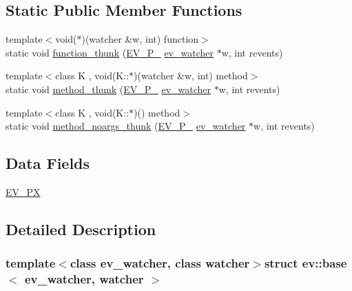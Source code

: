 \subsection*{\-Static \-Public \-Member \-Functions}
\begin{DoxyCompactItemize}
\item 
{\footnotesize template$<$void($\ast$)(watcher \&w, int) function$>$ }\\static void \hyperlink{structev_1_1base_ab6a9dbee5f754f64a234ad4e4d287d03}{function\-\_\-thunk} (\hyperlink{ev_8h_a8ac42969e0a499b8c1367f0ad85dbba9}{\-E\-V\-\_\-\-P\-\_\-} \hyperlink{structev__watcher}{ev\-\_\-watcher} $\ast$w, int revents)
\item 
{\footnotesize template$<$class K , void(\-K\-::$\ast$)(watcher \&w, int) method$>$ }\\static void \hyperlink{structev_1_1base_a8038092c2cdb65f0c09001e2eb846340}{method\-\_\-thunk} (\hyperlink{ev_8h_a8ac42969e0a499b8c1367f0ad85dbba9}{\-E\-V\-\_\-\-P\-\_\-} \hyperlink{structev__watcher}{ev\-\_\-watcher} $\ast$w, int revents)
\item 
{\footnotesize template$<$class K , void(\-K\-::$\ast$)() method$>$ }\\static void \hyperlink{structev_1_1base_a5baff17580ab861b158097ca00224adf}{method\-\_\-noargs\-\_\-thunk} (\hyperlink{ev_8h_a8ac42969e0a499b8c1367f0ad85dbba9}{\-E\-V\-\_\-\-P\-\_\-} \hyperlink{structev__watcher}{ev\-\_\-watcher} $\ast$w, int revents)
\end{DoxyCompactItemize}
\subsection*{\-Data \-Fields}
\begin{DoxyCompactItemize}
\item 
\hyperlink{structev_1_1base_a10f8def21e238e568c7bd2541aaae780}{\-E\-V\-\_\-\-P\-X}
\end{DoxyCompactItemize}


\subsection{\-Detailed \-Description}
\subsubsection*{template$<$class ev\-\_\-watcher, class watcher$>$struct ev\-::base$<$ ev\-\_\-watcher, watcher $>$}



